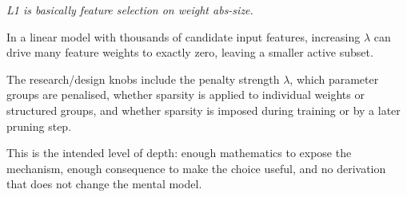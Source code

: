 \begin{calloutintuition}
\textit{L1 is basically feature selection on weight abs-size.}
\end{calloutintuition}

\begin{calloutexample}
In a linear model with thousands of candidate input features, increasing $\lambda$ can drive many feature weights to exactly zero, leaving a smaller active subset.
\end{calloutexample}

\begin{calloutdegreeofexperiment}
The research/design knobs include the penalty strength $\lambda$, which parameter groups are penalised, whether sparsity is applied to individual weights or structured groups, and whether sparsity is imposed during training or by a later pruning step.
\end{calloutdegreeofexperiment}

This is the intended level of depth: enough mathematics to expose the mechanism, enough consequence to make the choice useful, and no derivation that does not change the mental model.